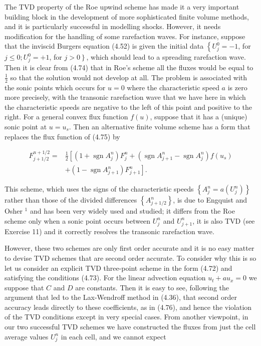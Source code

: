 \documentclass[10pt]{article}
\begin{document}
The TVD property of the Roe upwind scheme has made it a very important building block in the development of more sophisticated finite volume methods, and it is particularly successful in modelling shocks. However, it needs modification for the handling of some rarefaction waves. For instance, suppose that the inviscid Burgers equation (4.52) is given the initial data \(\left\{U_{j}^{0}=-1\right.\), for \(j \leq 0 ; U_{j}^{0}=+1\), for \(\left.j>0\right\}\), which should lead to a spreading rarefaction wave. Then it is clear from (4.74) that in Roe's scheme all the fluxes would be equal to \(\frac{1}{2}\) so that the solution would not develop at all. The problem is associated with the sonic points which occurs for \(u=0\) where the characteristic speed \(a\) is zero more precisely, with the transonic rarefaction wave that we have here in which the characteristic speeds are negative to the left of this point and positive to the right. For a general convex flux function \(f(u)\), suppose that it has a (unique) sonic point at \(u=u_{s}\). Then an alternative finite volume scheme has a form that replaces the flux function of (4.75) by

\[
\begin{aligned}
F_{j+1 / 2}^{n+1 / 2}= & \frac{1}{2}\left[\left(1+\operatorname{sgn} A_{j}^{n}\right) F_{j}^{n}+\left(\operatorname{sgn} A_{j+1}^{n}-\operatorname{sgn} A_{j}^{n}\right) f\left(u_{s}\right)\right. \\
& \left.+\left(1-\operatorname{sgn} A_{j+1}^{n}\right) F_{j+1}^{n}\right] .
\end{aligned}
\]

This scheme, which uses the signs of the characteristic speeds \(\left\{A_{j}^{n}=\right. \left.a\left(U_{j}^{n}\right)\right\}\) rather than those of the divided differences \(\left\{A_{j+1 / 2}^{n}\right\}\), is due to Engquist and Osher \({ }^{1}\) and has been very widely used and studied; it differs from the Roe scheme only when a sonic point occurs between \(U_{j}^{n}\) and \(U_{j+1}^{n}\), it is also TVD (see Exercise 11) and it correctly resolves the transonic rarefaction wave.

However, these two schemes are only first order accurate and it is no easy matter to devise TVD schemes that are second order accurate. To consider why this is so let us consider an explicit TVD three-point scheme in the form (4.72) and satisfying the conditions (4.73). For the linear advection equation \(u_{t}+a u_{x}=0\) we suppose that \(C\) and \(D\) are constants. Then it is easy to see, following the argument that led to the Lax-Wendroff method in (4.36), that second order accuracy leads directly to these coefficients, as in (4.76), and hence the violation of the TVD conditions except in very special cases. From another viewpoint, in our two successful TVD schemes we have constructed the fluxes from just the cell average values \(U_{j}^{n}\) in each cell, and we cannot expect
\end{document}
